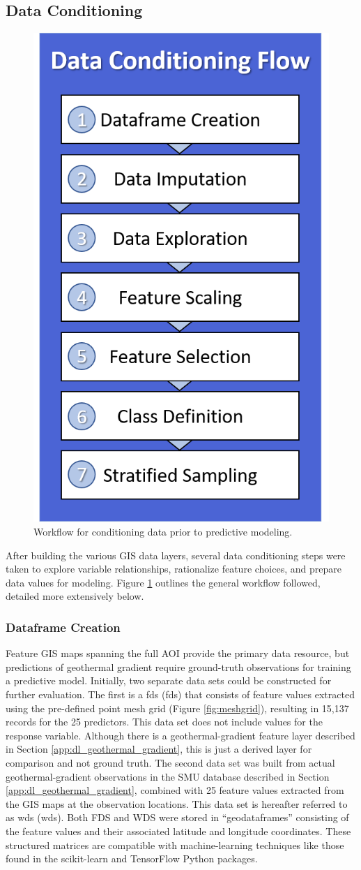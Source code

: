 \subsection{Data Conditioning}\label{ch3:conditioning}

\begin{figure}
\centering
\includegraphics[width=0.35\linewidth]{templates/images/Flow-DataConditioning.png}
\singlespacing
\caption[Data conditioning workflow]{Workflow for conditioning data prior to predictive modeling.}
\label{fig:DC_Flow}
\end{figure}

After building the various GIS data layers, several data conditioning steps were taken to explore variable relationships, rationalize feature choices, and prepare data values for modeling. Figure \ref{fig:DC_Flow} outlines the general workflow followed, detailed more extensively below.

\subsubsection{Dataframe Creation}

Feature GIS maps spanning the full AOI provide the primary data resource, but predictions of geothermal gradient require ground-truth observations for training a predictive model. Initially, two separate data sets could be constructed for further evaluation. The first is a \acrlong{fds} (\acrshort{fds}) that consists of feature values extracted using the pre-defined point mesh grid (Figure \ref{fig:meshgrid}), resulting in 15,137 records for the 25 predictors. This data set does not include values for the response variable. Although there is a geothermal-gradient feature layer described in Section \ref{app:dl_geothermal_gradient}, this is just a derived layer for comparison and not ground truth. The second data set was built from actual geothermal-gradient observations in the SMU database described in Section \ref{app:dl_geothermal_gradient}, combined with 25 feature values extracted from the GIS maps at the observation locations. This data set is hereafter referred to as \acrlong{wds} (\acrshort{wds}). Both FDS and WDS were stored in ``geodataframes'' consisting of the feature values and their associated latitude and longitude coordinates. These structured matrices are compatible with machine-learning techniques like those found in the scikit-learn \citep{pedregosa_scikit-learn_2011} and TensorFlow \citep{abadi_tensorflow_2016} Python packages. 

